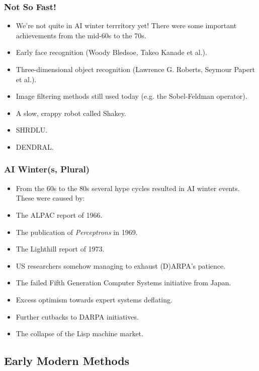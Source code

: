 \documentclass{beamer}
\begin{document}
  \begin{frame}
    \frametitle{Not So Fast!}

    \begin{itemize}
      \item We're not quite in AI winter terrritory yet! There were some
        important achievements from the mid-60s to the 70s.
      \pause
      \item Early face recognition (Woody Bledsoe, Takeo Kanade et al.).
      \pause
      \item Three-dimensional object recognition (Lawrence G. Roberts, Seymour
        Papert et al.).
      \pause
      \item Image filtering methods still used today (e.g. the Sobel-Feldman
        operator).
      \pause
      \item A slow, crappy robot called Shakey.
      \pause
      \item SHRDLU.
      \pause
      \item DENDRAL.
    \end{itemize}
  \end{frame}

  \begin{frame}
    \frametitle{AI Winter(s, Plural)}

    \begin{itemize}
      \item From the 60s to the 80s several hype cycles resulted in AI winter
        events. These were caused by:
      \pause
      \item The ALPAC report of 1966.
      \pause
      \item The publication of \textit{Perceptrons} in 1969.
      \pause
      \item The Lighthill report of 1973.
      \pause
      \item US researchers somehow managing to exhaust (D)ARPA's patience.
      \pause
      \item The failed Fifth Generation Computer Systems initiative from
        Japan.
      \pause
      \item Excess optimism towards expert systems deflating.
      \pause
      \item Further cutbacks to DARPA initiatives.
      \pause
      \item The collapse of the Lisp machine market.
    \end{itemize}
  \end{frame}

  \subsection{Early Modern Methods}
\end{document}
